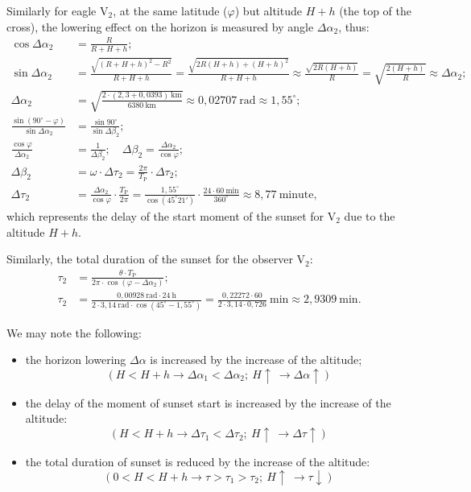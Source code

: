 \begin{description}
  Similarly for eagle $\mathrm{V}_2$, at the same latitude ($\varphi$) but
  altitude $H + h$ (the top of the cross), the lowering effect on the
  horizon is measured by angle $\Delta\alpha_2$, thus:
  \begin{align*}
  \cos\Delta\alpha_2 &= \frac{R}{R+H+h};\\
  \sin\Delta\alpha_2 &= \frac{\sqrt{(R+H+h)^2 - R^2}}{R+H+h}
    = \frac{\sqrt{2R(H+h) + (H+h)^2}}{R+H+h}
    \approx \frac{\sqrt{2R(H+h)}}{R}
    = \sqrt{\frac{2(H+h)}{R}} \approx \Delta\alpha_2;\\
  \Delta\alpha_2 &= \sqrt{\frac{2\cdot(2{,}3 + 0{,}0393)\ \mathrm{km}}
                              {6380\ \mathrm{km}}}
    \approx 0{,}02707\ \mathrm{rad} \approx 1{,}55^\circ;\\
  \frac{\sin(90^\circ - \varphi)}{\sin\Delta\alpha_2}
    &= \frac{\sin 90^\circ}{\sin\Delta\beta_2};\\
  \frac{\cos\varphi}{\Delta\alpha_2} &= \frac{1}{\Delta\beta_2};\quad
    \Delta\beta_2 = \frac{\Delta\alpha_2}{\cos\varphi};\\
  \Delta\beta_2 &= \omega\cdot\Delta\tau_2
    = \frac{2\pi}{T_{\mathrm{P}}}\cdot\Delta\tau_2;\\
  \Delta\tau_2 &= \frac{\Delta\alpha_2}{\cos\varphi}\cdot
      \frac{T_{\mathrm{P}}}{2\pi}
    = \frac{1{,}55^\circ}{\cos(45^\circ 21')}\cdot
      \frac{24\cdot 60\ \mathrm{min}}{360^\circ}
    \approx 8{,}77\ \mathrm{minute},
  \end{align*}
  which represents the delay of the start moment of the sunset for
  $\mathrm{V}_2$ due to the altitude $H + h$.

  Similarly, the total duration of the sunset for the observer
  $\mathrm{V}_2$:
  \begin{align*}
  \tau_2 &= \frac{\theta\cdot T_{\mathrm{P}}}
                {2\pi\cdot\cos(\varphi - \Delta\alpha_2)};\\
  \tau_2 &= \frac{0{,}00928\ \mathrm{rad}\cdot 24\ \mathrm{h}}
               {2\cdot 3{,}14\ \mathrm{rad}\cdot\cos(45^\circ - 1{,}55^\circ)}
    = \frac{0{,}22272\cdot 60}{2\cdot 3{,}14\cdot 0{,}726}\ \mathrm{min}
    \approx 2{,}9309\ \mathrm{min}.
  \end{align*}

  We may note the following:
  \begin{itemize}
  \item the horizon lowering $\Delta\alpha$ is increased by the increase of
    the altitude;
    \[ (H < H+h \rightarrow \Delta\alpha_1 < \Delta\alpha_2;\
       H\uparrow\ \rightarrow \Delta\alpha\uparrow) \]
  \item the delay of the moment of sunset start is increased by the increase
    of the altitude:
    \[ (H < H+h \rightarrow \Delta\tau_1 < \Delta\tau_2;\
       H\uparrow\ \rightarrow \Delta\tau\uparrow) \]
  \item the total duration of sunset is reduced by the increase of the
    altitude:
    \[ (0 < H < H+h \rightarrow \tau > \tau_1 > \tau_2;\
       H\uparrow\ \rightarrow \tau\downarrow) \]
  \end{itemize}


\end{description}
